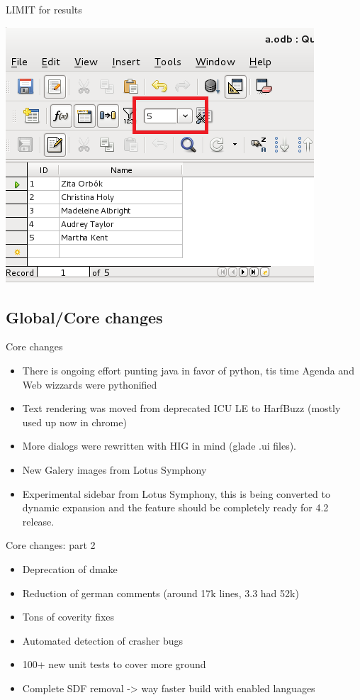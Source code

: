 \documentclass{beamer}
\begin{document}
\begin{frame}{LIMIT for results}
	\begin{center}
	\includegraphics[width= 0.7\linewidth]{limit-base.png}
	\end{center}
\end{frame}

\subsection{Global/Core changes}

\begin{frame}[t]{Core changes}
	\begin{itemize}
	\item There is ongoing effort punting java in favor of python, tis time Agenda and Web wizzards were pythonified
	\item Text rendering was moved from deprecated ICU LE to HarfBuzz (mostly used up now in chrome)
	\item More dialogs were rewritten with HIG in mind (glade .ui files).
	\item New Galery images from Lotus Symphony
	\item Experimental sidebar from Lotus Symphony, this is being converted to dynamic expansion and the feature should be completely ready for 4.2 release.
	\end{itemize}
\end{frame}

\begin{frame}[t]{Core changes: part 2}
	\begin{itemize}
	\item Deprecation of dmake
	\item Reduction of german comments (around 17k lines, 3.3 had 52k)
	\item Tons of coverity fixes
	\item Automated detection of crasher bugs
	\item 100+ new unit tests to cover more ground
	\item Complete SDF removal -> way faster build with enabled languages
	\end{itemize}
\end{frame}
\end{document}
